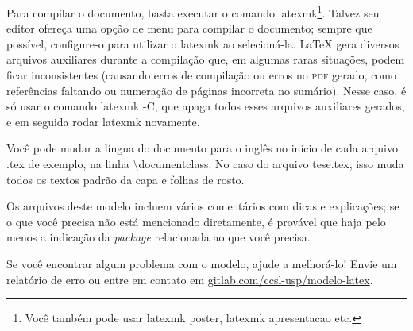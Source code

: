 Para compilar o documento, basta executar o comando
\textsf{latexmk}\footnote{Você também pode usar \textsf{latexmk poster},
\textsf{latexmk apresentacao} etc.}. Talvez seu editor ofereça uma opção
de menu para compilar o documento; sempre que possível, configure-o para
utilizar o \textsf{latexmk} ao selecioná-la. \LaTeX{} gera diversos arquivos
auxiliares durante a compilação que, em algumas raras situações, podem ficar
inconsistentes (causando erros de compilação ou erros no \textsc{pdf} gerado,
como referências faltando ou numeração de páginas incorreta no sumário).
Nesse caso, é só usar o comando \textsf{latexmk -C}, que apaga todos esses
arquivos auxiliares gerados, e em seguida rodar \textsf{latexmk} novamente.

Você pode mudar a língua do documento para o inglês no início de cada
arquivo .tex de exemplo, na linha \textsf{\textbackslash{}documentclass}.
No caso do arquivo \textsf{tese.tex}, isso muda todos os textos padrão
da capa e folhas de rosto.

Os arquivos deste modelo incluem vários comentários com dicas e explicações;
se o que você precisa não está mencionado diretamente, é provável que haja
pelo menos a indicação da \textit{package} relacionada ao que você precisa.

Se você encontrar algum problema com o modelo, ajude a melhorá-lo!
Envie um relatório de erro ou entre em contato em
\url{gitlab.com/ccsl-usp/modelo-latex}.
